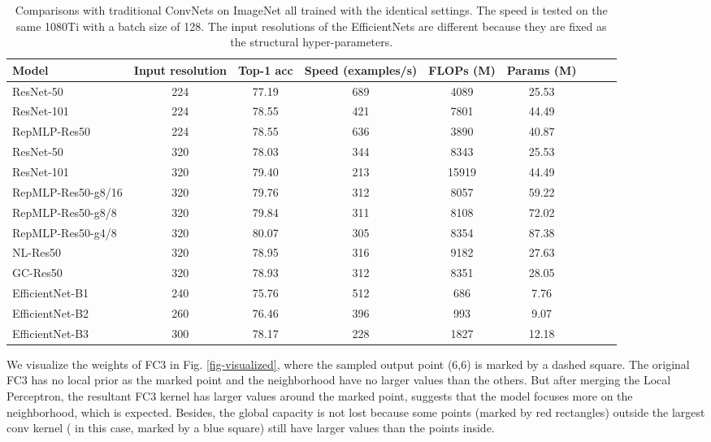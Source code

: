 \documentclass[10pt,twocolumn,letterpaper]{article}
\begin{document}
\setlength{\tabcolsep}{4pt}
\begin{table*}
	\caption{Comparisons with traditional ConvNets on ImageNet all trained with the identical settings. The speed is tested on the same 1080Ti with a batch size of 128. The input resolutions of the EfficientNets are different because they are fixed as the structural hyper-parameters.}
	\label{table-comparisons}
	\vspace{-0.2in}
	\begin{center}
		\small
		\begin{tabular}{lcccccccc}
			\hline
			Model			&	Input resolution&	Top-1 acc&	Speed (examples/s)	&	FLOPs (M)	&	Params (M)	\\
			\hline
			ResNet-50		&	224				&	77.19		&	689		&	4089	&	25.53			\\
			ResNet-101		&	224				&	78.55		&	421		&	7801	&	44.49			\\
RepMLP-Res50	&	224				&	78.55		&	636		&	3890	&	40.87			\\	\hline
			ResNet-50		&	320				&	78.03		&	344		&	8343	&	25.53			\\
			ResNet-101		&	320				&	79.40		&	213		&	15919	&	44.49			\\


			RepMLP-Res50-g8/16&	320				&	79.76		&	312		&	8057	&	59.22			\\		RepMLP-Res50-g8/8&	320				&	79.84		&	311		&	8108	&	72.02			\\		RepMLP-Res50-g4/8&	320				&	80.07		&	305		&	8354	&	87.38			\\		

			NL-Res50	&	320				&	78.95		&	316		&	9182	&	27.63			\\
			GC-Res50	&	320				&	78.93		&	312		&	8351	&	28.05			\\
			\hline
			EfficientNet-B1	&	240				&	75.76		&	512		&	686		&	7.76	\\
			EfficientNet-B2	&	260				&	76.46		&	396		&	993		&	9.07	\\
			EfficientNet-B3	&	300				&	78.17		&	228		&	1827	&	12.18	\\
			\hline
		\end{tabular}
	\end{center}
	\vspace{-0.25in}
\end{table*}
\setlength{\tabcolsep}{1.4pt}

We visualize the weights of FC3 in Fig. \ref{fig-visualized}, where the sampled output point (6,6) is marked by a dashed square. The original FC3 has no local prior as the marked point and the neighborhood have no larger values than the others. But after merging the Local Perceptron, the resultant FC3 kernel has larger values around the marked point, suggests that the model focuses more on the neighborhood, which is expected. Besides, the global capacity is not lost because some points (marked by red rectangles) outside the largest conv kernel ( in this case, marked by a blue square) still have larger values than the points inside.
\end{document}
